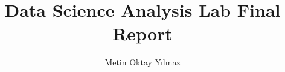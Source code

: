 \documentclass[12pt, a4paper]{report}
\title{Data Science Analysis Lab Final Report}
\author{Metin Oktay Yılmaz}
\begin{document}
    
    {\tableofcontents\let\clearpage\relax\listoffigures\let\clearpage\relax\lstlistoflistings}
    \newpage
    
    
    
    
\end{document}
